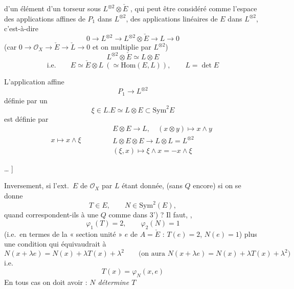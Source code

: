 \documentclass[11pt,a4paper]{article}
\begin{document}
d'un élément d'un torseur sous $L^{\otimes 2} \otimes \check{E}$ , qui  peut être considéré comme l'espace des applications affines de $P_{1}$ dans $L^{\otimes 2}$,  des applications linéaires de $E$ dans $L^{\otimes 2}$, \struck{\ill{}} c'est-à-dire
\[
  0 \to L^{\otimes 2} \to L^{\otimes 2} \otimes \check{E} \to L \to 0
\]
(car $0 \to \mathcal{O}_{X} \to \check{E} \to \check{L} \to 0$ et on multiplie par $L^{\otimes 2}$)
\[
  L^{\otimes 2} \otimes \check{E} \simeq L \otimes E
\]
\[
  \text{i.e.}\qquad E \simeq \check{E} \otimes L \ (\simeq \mathrm{Hom}(E, L)), \qquad L = \det E
\]

L'application affine
\[
  P_{1} \longrightarrow L^{\otimes 2}
\]
définie par un
\[
  \xi \in L.E \simeq L \otimes E \subset \mathrm{Sym}^{2}E
\]
est définie par
\[
  x \longmapsto x \wedge \xi
  \qquad\qquad
  \begin{array}{l}
    E \otimes E \to L, \quad (x \otimes y) \mapsto x \wedge y\\
    L \otimes E \otimes E \to L \otimes L = L^{\otimes 2}\\
    (\xi, x) \mapsto \xi \wedge x = -x \wedge \xi
  \end{array}
\]

… ]

Inversement, si l'ext.\ $E$ de $\mathcal{O}_{X}$ par $L$ étant donnée, (sans $Q$ encore) si on se donne
\[
  T \in E, \qquad N \in \mathrm{Sym}^{2}(E),
\]
quand correspondent-ils à une $Q$ comme dans 3') ? Il faut, ,
\[
  \varphi_{1}(T) = 2, \qquad \varphi_{2}(N) = 1
\]
(i.e.\ en termes de la « section unité » $e$ de $A = \check{E}$ : $T(e) = 2$, $N(e) = 1$) plus une condition qui équivaudrait à
\[
  N(x + \lambda e) = N(x) + \lambda T(x) + \lambda^{2}
  \qquad\text{(on aura $N(x + \lambda e) = N(x) + \lambda T(x) + \lambda^{2}$)}
\]
i.e.
\[
  T(x) = \varphi_{N}(x, e)
\]
En tous cas on doit avoir : \emph{$N$ détermine $T$}
\end{document}
